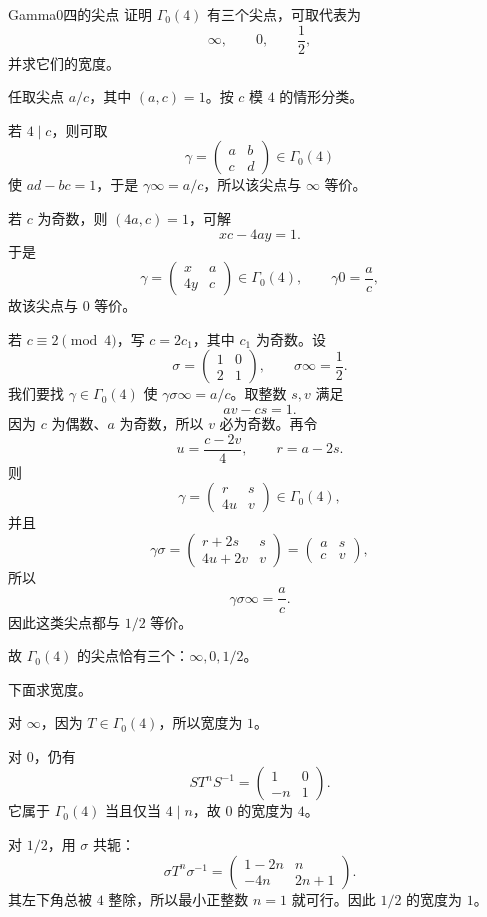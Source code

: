 \begin{problem}{Gamma0四的尖点}
\hard
证明 $\Gamma_0(4)$ 有三个尖点，可取代表为
\[
\infty,\qquad 0,\qquad \frac12,
\]
并求它们的宽度。
\end{problem}
\begin{solution}
任取尖点 $a/c$，其中 $(a,c)=1$。按 $c$ 模 $4$ 的情形分类。

若 $4\mid c$，则可取
\[
\gamma=\begin{pmatrix}a&b\\c&d\end{pmatrix}\in\Gamma_0(4)
\]
使 $ad-bc=1$，于是 $\gamma\infty=a/c$，所以该尖点与 $\infty$ 等价。

若 $c$ 为奇数，则 $(4a,c)=1$，可解
\[
xc-4ay=1.
\]
于是
\[
\gamma=\begin{pmatrix}x&a\\4y&c\end{pmatrix}\in\Gamma_0(4),
\qquad
\gamma 0=\frac{a}{c},
\]
故该尖点与 $0$ 等价。

若 $c\equiv 2\pmod 4$，写 $c=2c_1$，其中 $c_1$ 为奇数。设
\[
\sigma=\begin{pmatrix}1&0\\2&1\end{pmatrix},
\qquad \sigma\infty=\frac12.
\]
我们要找 $\gamma\in\Gamma_0(4)$ 使 $\gamma\sigma\infty=a/c$。取整数 $s,v$ 满足
\[
av-cs=1.
\]
因为 $c$ 为偶数、$a$ 为奇数，所以 $v$ 必为奇数。再令
\[
u=\frac{c-2v}{4},\qquad r=a-2s.
\]
则
\[
\gamma=\begin{pmatrix}r&s\\4u&v\end{pmatrix}\in\Gamma_0(4),
\]
并且
\[
\gamma\sigma=
\begin{pmatrix}r+2s&s\\4u+2v&v\end{pmatrix}=
\begin{pmatrix}a&s\\c&v\end{pmatrix},
\]
所以
\[
\gamma\sigma\infty=\frac{a}{c}.
\]
因此这类尖点都与 $1/2$ 等价。

故 $\Gamma_0(4)$ 的尖点恰有三个：$\infty,0,1/2$。

下面求宽度。

对 $\infty$，因为 $T\in\Gamma_0(4)$，所以宽度为 $1$。

对 $0$，仍有
\[
ST^nS^{-1}=\begin{pmatrix}1&0\\-n&1\end{pmatrix}.
\]
它属于 $\Gamma_0(4)$ 当且仅当 $4\mid n$，故 $0$ 的宽度为 $4$。

对 $1/2$，用 $\sigma$ 共轭：
\[
\sigma T^n\sigma^{-1}=
\begin{pmatrix}1-2n&n\\-4n&2n+1\end{pmatrix}.
\]
其左下角总被 $4$ 整除，所以最小正整数 $n=1$ 就可行。因此 $1/2$ 的宽度为 $1$。
\end{solution}

